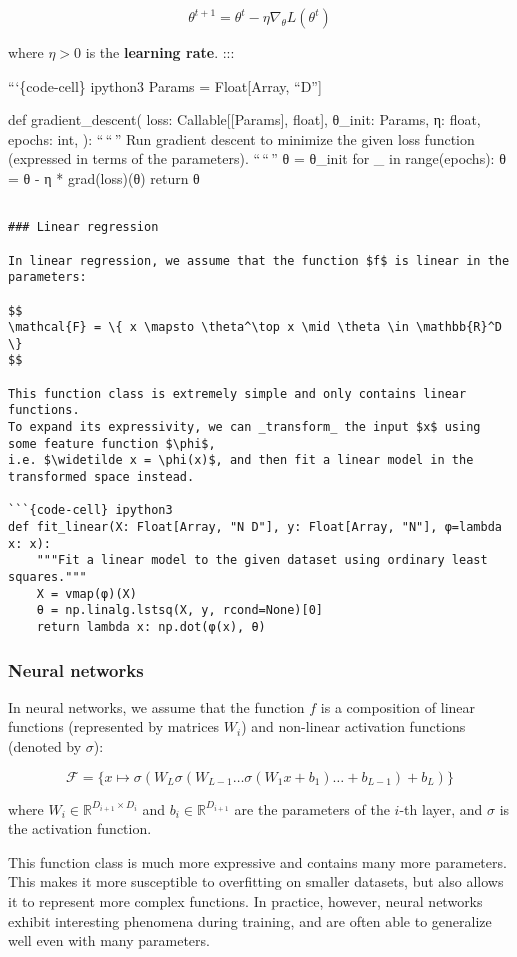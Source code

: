 \[
\theta^{t+1} = \theta^t - \eta \nabla_\theta L(\theta^t)
\]

where \(\eta > 0\) is the \textbf{learning rate}. :::

```\{code-cell\} ipython3 Params = Float{[}Array, ``D''{]}

def gradient\_descent( loss: Callable{[}{[}Params{]}, float{]}, θ\_init:
Params, η: float, epochs: int, ): ``\,``\,'' Run gradient descent to
minimize the given loss function (expressed in terms of the parameters).
``\,``\,'' θ = θ\_init for \_ in range(epochs): θ = θ - η *
grad(loss)(θ) return θ

\begin{verbatim}

### Linear regression

In linear regression, we assume that the function $f$ is linear in the parameters:

$$
\mathcal{F} = \{ x \mapsto \theta^\top x \mid \theta \in \mathbb{R}^D \}
$$

This function class is extremely simple and only contains linear functions.
To expand its expressivity, we can _transform_ the input $x$ using some feature function $\phi$,
i.e. $\widetilde x = \phi(x)$, and then fit a linear model in the transformed space instead.

```{code-cell} ipython3
def fit_linear(X: Float[Array, "N D"], y: Float[Array, "N"], φ=lambda x: x):
    """Fit a linear model to the given dataset using ordinary least squares."""
    X = vmap(φ)(X)
    θ = np.linalg.lstsq(X, y, rcond=None)[0]
    return lambda x: np.dot(φ(x), θ)
\end{verbatim}

\subsubsection{Neural networks}\label{neural-networks}

In neural networks, we assume that the function \(f\) is a composition
of linear functions (represented by matrices \(W_i\)) and non-linear
activation functions (denoted by \(\sigma\)):

\[
\mathcal{F} = \{ x \mapsto \sigma(W_L \sigma(W_{L-1} \dots \sigma(W_1 x + b_1) \dots + b_{L-1}) + b_L) \}
\]

where \(W_i \in \mathbb{R}^{D_{i+1} \times D_i}\) and
\(b_i \in \mathbb{R}^{D_{i+1}}\) are the parameters of the \(i\)-th
layer, and \(\sigma\) is the activation function.

This function class is much more expressive and contains many more
parameters. This makes it more susceptible to overfitting on smaller
datasets, but also allows it to represent more complex functions. In
practice, however, neural networks exhibit interesting phenomena during
training, and are often able to generalize well even with many
parameters.

